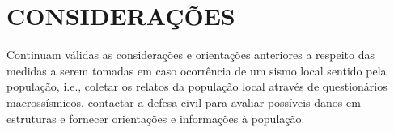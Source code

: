 \section{CONSIDERAÇÕES}
\label{sec:consideracoes}
Continuam válidas as considerações e orientações anteriores a respeito das medidas a serem tomadas em caso ocorrência de um sismo local sentido pela população, i.e., coletar os relatos da população local através de questionários macrossísmicos, contactar a defesa civil para avaliar possíveis danos em estruturas e fornecer orientações e informações à população. 

\assinaturaLucas
